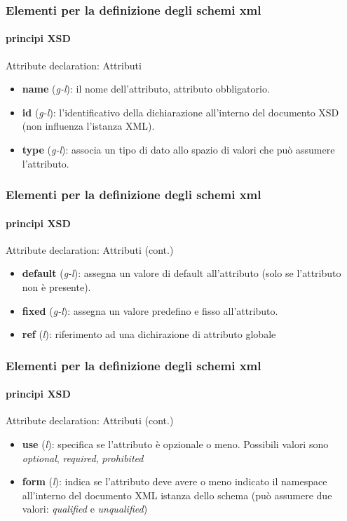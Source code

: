 \begin{frame}
	\frametitle{Elementi per la definizione degli schemi xml}
	\framesubtitle{principi XSD}
	\addtocounter{nframe}{1}

	\begin{block}{Attribute declaration: Attributi}
		\begin{itemize}
			\item \textbf{name} (\textit{g-l}): il nome dell'attributo, attributo obbligatorio.
			\item \textbf{id} (\textit{g-l}): l'identificativo della dichiarazione all'interno del documento XSD (non influenza l'istanza XML).
			\item \textbf{type} (\textit{g-l}): associa un tipo di dato allo spazio di valori che può assumere l'attributo.
		\end{itemize}

	\end{block}

\end{frame}


\begin{frame}
	\frametitle{Elementi per la definizione degli schemi xml}
	\framesubtitle{principi XSD}
	\addtocounter{nframe}{1}

	\begin{block}{Attribute declaration: Attributi (cont.)}
		\begin{itemize}
			\item \textbf{default} (\textit{g-l}): assegna un valore di default all'attributo (solo se l'attributo non è presente).
			\item \textbf{fixed} (\textit{g-l}): assegna un valore predefino e fisso all'attributo.
			\item \textbf{ref} (\textit{l}): riferimento ad una dichirazione di attributo globale
		\end{itemize}
	\end{block}


\end{frame}


\begin{frame}
	\frametitle{Elementi per la definizione degli schemi xml}
	\framesubtitle{principi XSD}
	\addtocounter{nframe}{1}

	\begin{block}{Attribute declaration: Attributi (cont.)}
		\begin{itemize}
			\item \textbf{use} (\textit{l}): specifica se l'attributo è opzionale o meno. Possibili valori sono \textit{optional}, \textit{required}, \textit{prohibited}
			\item \textbf{form} (\textit{l}): indica se l'attributo deve avere o meno indicato il namespace all'interno del documento XML istanza dello schema (può assumere due valori: \textit{qualified} e \textit{unqualified})
		\end{itemize}

	\end{block}

\end{frame}


